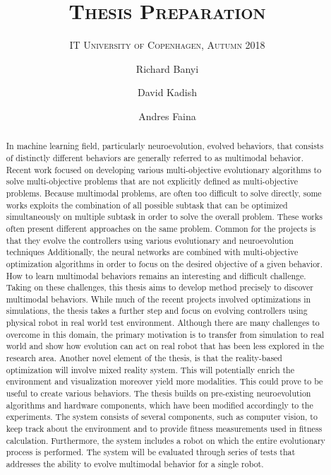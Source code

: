 \documentclass[format=acmsmall, review=false, screen=true]{acmart}
\author{Richard Banyi}
\affiliation{%
  \institution{IT University of Copenhagen}
  \streetaddress{Rued Langgaards Vej 7}
  \city{Copenhagen}
  \postcode{2300}
  \country{Denmark}
}
\author{David Kadish}
\affiliation{%
  \institution{Supervisor}
}
\affiliation{%
  \institution{IT University of Copenhagen}
}
\affiliation{%
  \institution{Robotics, Evolution, and Art Lab}
}
\author{Andres Faina}
\affiliation{%
  \institution{Supervisor}
}
\affiliation{%
  \institution{IT University of Copenhagen}
  \streetaddress{Rued Langgaards Vej 7}
  \city{Copenhagen}
  \postcode{2300}
  \country{Denmark}
}
\affiliation{%
  \institution{Robotics, Evolution, and Art Lab}
}
\title{\textsc{Thesis Preparation }}
\subtitle{\textsc{IT University of Copenhagen, Autumn 2018}}
\begin{document}
\begin{abstract}

In machine learning field, particularly neuroevolution, evolved behaviors, that consists of distinctly different behaviors  are generally referred to as multimodal behavior. Recent work focused on developing various multi-objective evolutionary algorithms to solve multi-objective problems that are not explicitly defined as multi-objective problems. Because multimodal problems, are often too difficult to solve directly, some works exploits the combination of all possible subtask that can be optimized simultaneously on multiple subtask in order to solve the overall problem. These works often present different approaches on the same problem. Common for the projects is that they evolve the controllers using various evolutionary and neuroevolution techniques Additionally, the neural networks are combined with multi-objective optimization algorithms in order to focus on the desired objective of a given behavior. How to learn multimodal behaviors remains an interesting and difficult challenge. Taking on these challenges, this thesis aims to develop method precisely to discover multimodal behaviors. While much of the recent projects involved optimizations in simulations, the thesis takes a further step and focus on evolving controllers using physical robot in real world test environment. Although there are many challenges to overcome in this domain, the primary motivation is to transfer from simulation to real world and show how evolution can act on real robot that has been less explored in the research area. Another novel element of the thesis, is that the reality-based optimization will involve mixed reality system. This will potentially enrich the environment and visualization moreover yield more modalities. This could prove to be useful to create various behaviors. The thesis builds on pre-existing neuroevolution algorithms and hardware components, which have been modified accordingly to the experiments. The system consists of several components, such as computer vision, to keep track about the environment and to provide fitness measurements used in fitness calculation. Furthermore, the system includes a robot on which the entire evolutionary process is performed. The system will be evaluated through series of tests that addresses the ability to evolve multimodal behavior for a single robot.

\end{abstract}

\maketitle
\end{document}
